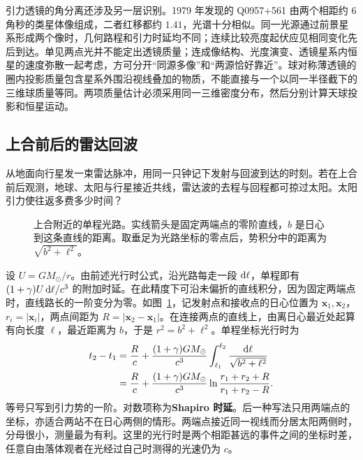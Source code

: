 引力透镜的角分离还涉及另一层识别。1979 年发现的 Q0957+561 由两个相距约 $6$ 角秒的类星体像组成，二者红移都约 $1.41$，光谱十分相似。同一光源通过前景星系形成两个像时，几何路程和引力时延均不同；连续比较亮度起伏应见相同变化先后到达。单见两点光并不能定出透镜质量；连成像结构、光度演变、透镜星系内恒星的速度弥散一起考虑，方可分开“同源多像”和“两源恰好靠近”。球对称薄透镜的圈内投影质量包含星系外围沿视线叠加的物质，不能直接与一个以同一半径截下的三维球质量等同。两项质量估计必须采用同一三维密度分布，然后分别计算天球投影和恒星运动。

\subsection{上合前后的雷达回波}

从地面向行星发一束雷达脉冲，用同一只钟记下发射与回波到达的时刻。若在上合前后观测，地球、太阳与行星接近共线，雷达波的去程与回程都可掠过太阳。太阳引力使往返多费多少时间？

\begin{figure}[htbp]
 \centering
 \caption{上合附近的单程光路。实线箭头是固定两端点的零阶直线，$b$ 是日心到这条直线的距离。取垂足为光路坐标的零点后，势积分中的距离为 $\sqrt{b^2+\ell^2}$。}
 \label{fig:exp-conjunction}
\end{figure}

设 $U=GM_\odot/r$。由前述光行时公式，沿光路每走一段 $\dd\ell$，单程即有 $(1+\gamma)U\,\dd\ell/c^3$ 的附加时延。在此精度下可沿未偏折的直线积分，因为固定两端点时，直线路长的一阶变分为零。如图~\ref{fig:exp-conjunction}，记发射点和接收点的日心位置为 $\bm x_1,\bm x_2$，$r_i=|\bm x_i|$，两点间距为 $R=|\bm x_2-\bm x_1|$。在连接两点的直线上，由离日心最近处起算有向长度 $\ell$，最近距离为 $b$，于是 $r^2=b^2+\ell^2$。单程坐标光行时为
\begin{align*}
    t_2-t_1
    &=\frac{R}{c}+\frac{(1+\gamma)GM_\odot}{c^3}
       \int_{\ell_1}^{\ell_2}\frac{\dd\ell}{\sqrt{b^2+\ell^2}}\\
    &=\frac{R}{c}+\frac{(1+\gamma)GM_\odot}{c^3}
       \ln\frac{r_1+r_2+R}{r_1+r_2-R}.
\end{align*}
等号只写到引力势的一阶。对数项称为\textbf{Shapiro 时延}。后一种写法只用两端点的坐标，亦适合两站不在日心两侧的情形。两端点接近同一视线而分居太阳两侧时，分母很小，测量最为有利。这里的光行时是两个相距甚远的事件之间的坐标时差，任意自由落体观者在光经过自己时测得的光速仍为 $c$。

